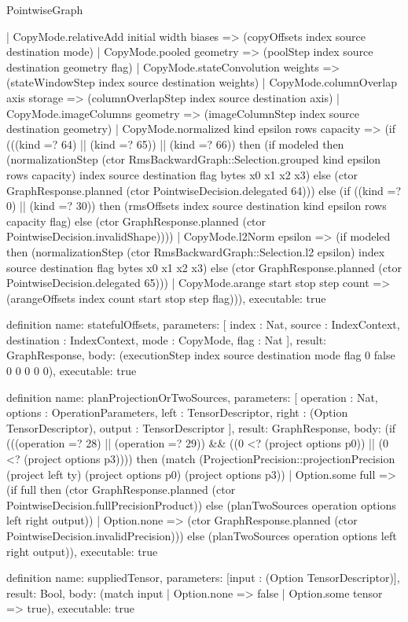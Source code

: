 \begin{lexlean}{PointwiseGraph}
\begin{semanticmodule}
{    | CopyMode.relativeAdd initial width biases => (copyOffsets index source destination mode)
    | CopyMode.pooled geometry => (poolStep index source destination geometry flag)
    | CopyMode.stateConvolution weights => (stateWindowStep index source destination weights)
    | CopyMode.columnOverlap axis storage => (columnOverlapStep index source destination axis)
    | CopyMode.imageColumns geometry => (imageColumnStep index source destination geometry)
    | CopyMode.normalized kind epsilon rows capacity => (if (((kind =? 64) || (kind =? 65)) || (kind =? 66)) then (if modeled then (normalizationStep (ctor RmsBackwardGraph::Selection.grouped kind epsilon rows capacity) index source destination flag bytes x0 x1 x2 x3) else (ctor GraphResponse.planned (ctor PointwiseDecision.delegated 64))) else (if ((kind =? 0) || (kind =? 30)) then (rmsOffsets index source destination kind epsilon rows capacity flag) else (ctor GraphResponse.planned (ctor PointwiseDecision.invalidShape))))
    | CopyMode.l2Norm epsilon => (if modeled then (normalizationStep (ctor RmsBackwardGraph::Selection.l2 epsilon) index source destination flag bytes x0 x1 x2 x3) else (ctor GraphResponse.planned (ctor PointwiseDecision.delegated 65)))
    | CopyMode.arange start stop step count => (arangeOffsets index count start stop step flag))),
  executable: true
}

definition{
  name: statefulOffsets,
  parameters: [
    index : Nat,
    source : IndexContext,
    destination : IndexContext,
    mode : CopyMode,
    flag : Nat
  ],
  result: GraphResponse,
  body: (executionStep index source destination mode flag 0 false 0 0 0 0 0),
  executable: true
}

definition{
  name: planProjectionOrTwoSources,
  parameters: [
    operation : Nat,
    options : OperationParameters,
    left : TensorDescriptor,
    right : (Option TensorDescriptor),
    output : TensorDescriptor
  ],
  result: GraphResponse,
  body: (if (((operation =? 28) || (operation =? 29)) && ((0 <? (project options p0)) || (0 <? (project options p3)))) then (match (ProjectionPrecision::projectionPrecision (project left ty) (project options p0) (project options p3))
    | Option.some full => (if full then (ctor GraphResponse.planned (ctor PointwiseDecision.fullPrecisionProduct)) else (planTwoSources operation options left right output))
    | Option.none => (ctor GraphResponse.planned (ctor PointwiseDecision.invalidPrecision))) else (planTwoSources operation options left right output)),
  executable: true
}

definition{
  name: suppliedTensor,
  parameters: [input : (Option TensorDescriptor)],
  result: Bool,
  body: (match input | Option.none => false | Option.some tensor => true),
  executable: true
}


\end{semanticmodule}
\end{lexlean}
